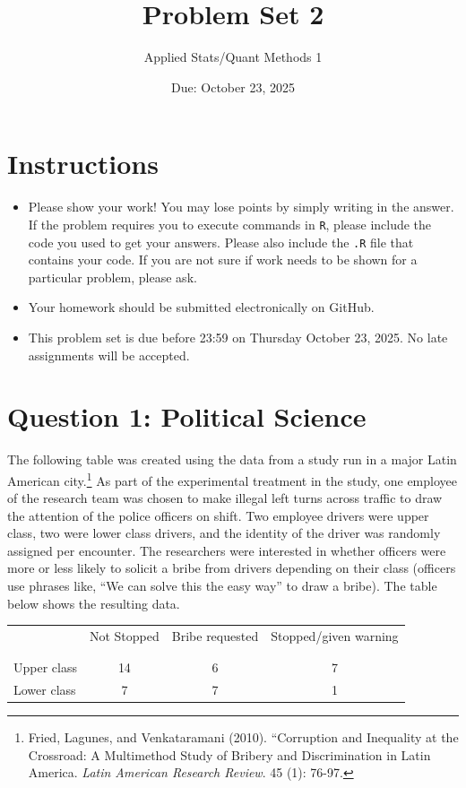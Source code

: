 \documentclass[12pt,letterpaper]{article}
\title{Problem Set 2}
\date{Due: October 23, 2025}
\author{Applied Stats/Quant Methods 1}
\begin{document}
	\maketitle
	\section*{Instructions}
	\begin{itemize}
		\item Please show your work! You may lose points by simply writing in the answer. If the problem requires you to execute commands in \texttt{R}, please include the code you used to get your answers. Please also include the \texttt{.R} file that contains your code. If you are not sure if work needs to be shown for a particular problem, please ask.
		\item Your homework should be submitted electronically on GitHub.
		\item This problem set is due before 23:59 on Thursday October 23, 2025. No late assignments will be accepted.
		
	\end{itemize}
	
	
	\vspace{.5cm}
	\section*{Question 1: Political Science}
	\vspace{.25cm}
	The following table was created using the data from a study run in a major Latin American city.\footnote{Fried, Lagunes, and Venkataramani (2010). ``Corruption and Inequality at the Crossroad: A Multimethod Study of Bribery and Discrimination in Latin America. \textit{Latin American Research Review}. 45 (1): 76-97.} As part of the experimental treatment in the study, one employee of the research team was chosen to make illegal left turns across traffic to draw the attention of the police officers on shift. Two employee drivers were upper class, two were lower class drivers, and the identity of the driver was randomly assigned per encounter. The researchers were interested in whether officers were more or less likely to solicit a bribe from drivers depending on their class (officers use phrases like, ``We can solve this the easy way'' to draw a bribe). The table below shows the resulting data.
	
	\newpage
	\begin{table}[h!]
		\centering
		\begin{tabular}{l | c c c }
			& Not Stopped & Bribe requested & Stopped/given warning \\
			\\[-1.8ex] 
			\hline \\[-1.8ex]
			Upper class & 14 & 6 & 7 \\
			Lower class & 7 & 7 & 1 \\
			\hline
		\end{tabular}
	\end{table}
	
\end{document}
